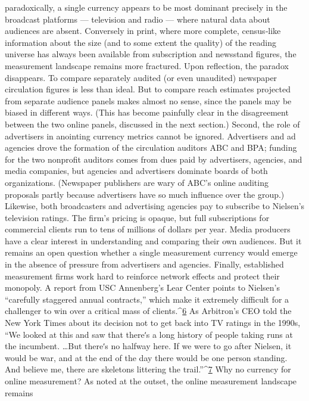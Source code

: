 paradoxically, a single currency appears to be most dominant precisely in
the broadcast platforms — television and radio — where natural data
about audiences are absent. Conversely in print, where more complete,
census‐like information about the size (and to some extent the quality) of
the reading universe has always been available from subscription and
newsstand figures, the measurement landscape remains more fractured.
Upon reflection, the paradox disappears. To compare separately audited
(or even unaudited) newspaper circulation figures is less than ideal. But to
compare reach estimates projected from separate audience panels makes
almost no sense, since the panels may be biased in different ways. (This
has become painfully clear in the disagreement between the two online
panels, discussed in the next section.)
Second, the role of advertisers in anointing currency metrics cannot be
ignored. Advertisers and ad agencies drove the formation of the
circulation auditors ABC and BPA; funding for the two nonprofit auditors
comes from dues paid by advertisers, agencies, and media companies, but
agencies and advertisers dominate boards of both organizations.
(Newspaper publishers are wary of ABC’s online auditing proposals
partly because advertisers have so much influence over the group.)
Likewise, both broadcasters and advertising agencies pay to subscribe to
Nielsen’s television ratings. The firm’s pricing is opaque, but full
subscriptions for commercial clients run to tens of millions of dollars per
year. Media producers have a clear interest in understanding and
comparing their own audiences. But it remains an open question whether
a single measurement currency would emerge in the absence of pressure
from advertisers and agencies.
Finally, established measurement firms work hard to reinforce network
effects and protect their monopoly. A report from USC Annenberg’s Lear
Center points to Nielsen’s ``carefully staggered annual contracts,'' which
make it extremely difficult for a challenger to win over a critical mass of
clients.^{\href{#endnotes}{6}} As Arbitron’s CEO told the New York Times about its decision not
to get back into TV ratings in the 1990s, ``We looked at this and saw that
thereʹs a long history of people taking runs at the incumbent. \ldots  But
thereʹs no halfway here. If we were to go after Nielsen, it would be war,
and at the end of the day there would be one person standing. And
believe me, there are skeletons littering the trail.''^{\href{#endnotes}{7}}
Why no currency for online measurement?
As noted at the outset, the online measurement landscape remains
